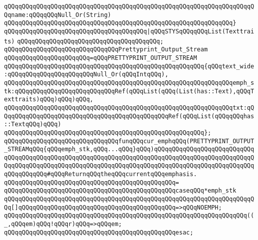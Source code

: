 \verb|qQQqqQQqqQQqqQQqqQQqqQQqqQQqqQQqqQQqqQQqqQQqqQQqqQQqqQQqqQQqqQQqqQQqqQQqname:qQQqqQQqNull_Or(String)|\newline
\verb|qQQqqQQqqQQqqQQqqQQqqQQqqQQqqQQqqQQqqQQqqQQqqQQqqQQqqQQqqQQqqQQq}|\newline
\verb|qQQqqQQqqQQqqQQqqQQqqQQqqQQqqQQqqQQqqQQq|\verb#|qQQqSTYSqQQqqQQqList(Texttraits)#\newline
\verb|qQQqqQQqqQQqqQQqqQQqqQQqqQQqqQQqqQQqqQQq;|\newline
\newline
\verb|qQQqqQQqqQQqqQQqqQQqqQQqqQQqqQQqPrettyprint_Output_Stream|\newline
\verb|qQQqqQQqqQQqqQQqqQQqqQQq=qQQqPRETTYPRINT_OUTPUT_STREAM|\newline
\verb|qQQqqQQqqQQqqQQqqQQqqQQqqQQqqQQqqQQqqQQqqQQqqQQqqQQqqQQq{qQQqtext_wide:qQQqqQQqqQQqqQQqqQQqqQQqNull_Or(qQQqIntqQQq),|\newline
\verb|qQQqqQQqqQQqqQQqqQQqqQQqqQQqqQQqqQQqqQQqqQQqqQQqqQQqqQQqqQQqqQQqemph_stk:qQQqqQQqqQQqqQQqqQQqqQQqqQQqRef(qQQqList(qQQq(List(has::Text),qQQqTexttraits)qQQq)qQQq)qQQq,|\newline
\verb|qQQqqQQqqQQqqQQqqQQqqQQqqQQqqQQqqQQqqQQqqQQqqQQqqQQqqQQqqQQqqQQqtxt:qQQqqQQqqQQqqQQqqQQqqQQqqQQqqQQqqQQqqQQqqQQqqQQqRef(qQQqList(qQQqqQQqhas::TextqQQq)qQQq)|\newline
\verb|qQQqqQQqqQQqqQQqqQQqqQQqqQQqqQQqqQQqqQQqqQQqqQQqqQQqqQQq};|\newline
\newline
\verb|qQQqqQQqqQQqqQQqqQQqqQQqqQQqqQQqfunqQQqcur_emphqQQq(PRETTYPRINT_OUTPUT_STREAMqQQq{qQQqemph_stk,qQQq...qQQq}qQQq)qQQqqQQqqQQqqQQqqQQqqQQqqQQqqQQqqQQqqQQqqQQqqQQqqQQqqQQqqQQqqQQqqQQqqQQqqQQqqQQqqQQqqQQqqQQqqQQqqQQqqQQqqQQqqQQqqQQqqQQqqQQqqQQqqQQqqQQqqQQqqQQqqQQqqQQqqQQqqQQqqQQqqQQqqQQqqQQqqQQq#qQQqReturnqQQqtheqQQqcurrentqQQqemphasis.|\newline
\verb|qQQqqQQqqQQqqQQqqQQqqQQqqQQqqQQqqQQqqQQqqQQqqQQq=|\newline
\verb|qQQqqQQqqQQqqQQqqQQqqQQqqQQqqQQqqQQqqQQqqQQqqQQqcaseqQQq*emph_stk|\newline
\verb|qQQqqQQqqQQqqQQqqQQqqQQqqQQqqQQqqQQqqQQqqQQqqQQqqQQqqQQqqQQqqQQqqQQqqQQq[]qQQqqQQqqQQqqQQqqQQqqQQqqQQqqQQqqQQqqQQqqQQq=>qQQqNOEMPH;|\newline
\verb|qQQqqQQqqQQqqQQqqQQqqQQqqQQqqQQqqQQqqQQqqQQqqQQqqQQqqQQqqQQqqQQqqQQq((_,qQQqem)qQQq!qQQqr)qQQq=>qQQqem;|\newline
\verb|qQQqqQQqqQQqqQQqqQQqqQQqqQQqqQQqqQQqqQQqqQQqqQQqesac;|\newline
